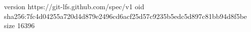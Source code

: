 version https://git-lfs.github.com/spec/v1
oid sha256:7fc4d04255a720d4d879e2496cd6acf25d57c9235b5edc5d897c81bb94d8f5be
size 16396
